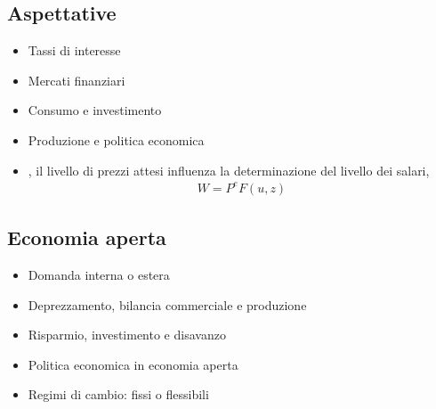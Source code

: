 \documentclass[letterpaper,10pt,italian]{jupyterBook}
\begin{document}
\subsection{Aspettative}
\label{\detokenize{ch/macro:aspettative}}\label{\detokenize{ch/macro:economics-hs-macro-extra-expectations}}\begin{itemize}
\item {} 
\sphinxAtStartPar
Tassi di interesse

\item {} 
\sphinxAtStartPar
Mercati finanziari

\item {} 
\sphinxAtStartPar
Consumo e investimento

\item {} 
\sphinxAtStartPar
Produzione e politica economica

\item {} 
\sphinxAtStartPar
{\hyperref[\detokenize{ch/macro:economics-hs-macro-medium-run-jobs-market-wages}]{}}, il livello di prezzi attesi influenza la determinazione del livello dei salari,
\begin{equation*}
\begin{split}W = P^e F(u,z)\end{split}
\end{equation*}
\end{itemize}


\subsection{Economia aperta}
\label{\detokenize{ch/macro:economia-aperta}}\label{\detokenize{ch/macro:economics-hs-macro-extra-open}}\begin{itemize}
\item {} 
\sphinxAtStartPar
Domanda interna o estera

\item {} 
\sphinxAtStartPar
Deprezzamento, bilancia commerciale e produzione

\item {} 
\sphinxAtStartPar
Risparmio, investimento e disavanzo

\item {} 
\sphinxAtStartPar
Politica economica in economia aperta

\item {} 
\sphinxAtStartPar
Regimi di cambio: fissi o flessibili

\end{itemize}
\end{document}
